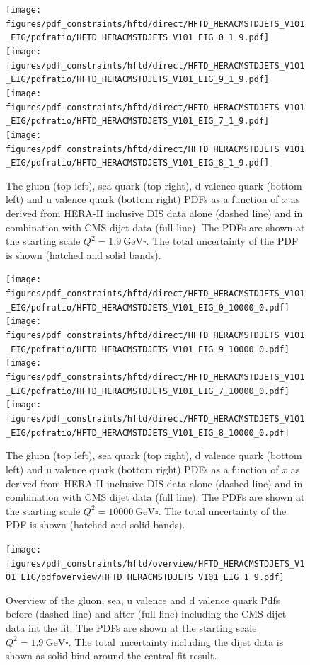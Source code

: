 \begin{figure}[tbp]
  \centering
  \texttt{[image: figures/pdf\_constraints/hftd/direct/HFTD\_HERACMSTDJETS\_V101\_EIG/pdfratio/HFTD\_HERACMSTDJETS\_V101\_EIG\_0\_1\_9.pdf]}\hfill%
  \texttt{[image: figures/pdf\_constraints/hftd/direct/HFTD\_HERACMSTDJETS\_V101\_EIG/pdfratio/HFTD\_HERACMSTDJETS\_V101\_EIG\_9\_1\_9.pdf]}
  \texttt{[image: figures/pdf\_constraints/hftd/direct/HFTD\_HERACMSTDJETS\_V101\_EIG/pdfratio/HFTD\_HERACMSTDJETS\_V101\_EIG\_7\_1\_9.pdf]}\hfill%
  \texttt{[image: figures/pdf\_constraints/hftd/direct/HFTD\_HERACMSTDJETS\_V101\_EIG/pdfratio/HFTD\_HERACMSTDJETS\_V101\_EIG\_8\_1\_9.pdf]}
  \caption[Direct comparison of gluon and quark PDFs]{The gluon (top left), sea
  quark (top right), d valence quark (bottom left) and u valence quark (bottom
right) PDFs as a function of $x$ as derived from HERA-II inclusive DIS data
alone (dashed line) and in combination with CMS dijet data (full line). The PDFs
are shown at the starting scale $Q^2 = \SI{1.9}{\GeV \square}$. The total
uncertainty of the PDF is shown (hatched and solid bands).}
  \label{fig:pdfconstraints:direct:19}
\end{figure}

\begin{figure}[tbp]
  \centering
  \texttt{[image: figures/pdf\_constraints/hftd/direct/HFTD\_HERACMSTDJETS\_V101\_EIG/pdfratio/HFTD\_HERACMSTDJETS\_V101\_EIG\_0\_10000\_0.pdf]}\hfill%
  \texttt{[image: figures/pdf\_constraints/hftd/direct/HFTD\_HERACMSTDJETS\_V101\_EIG/pdfratio/HFTD\_HERACMSTDJETS\_V101\_EIG\_9\_10000\_0.pdf]}
  \texttt{[image: figures/pdf\_constraints/hftd/direct/HFTD\_HERACMSTDJETS\_V101\_EIG/pdfratio/HFTD\_HERACMSTDJETS\_V101\_EIG\_7\_10000\_0.pdf]}\hfill%
  \texttt{[image: figures/pdf\_constraints/hftd/direct/HFTD\_HERACMSTDJETS\_V101\_EIG/pdfratio/HFTD\_HERACMSTDJETS\_V101\_EIG\_8\_10000\_0.pdf]}
  \caption[Direct comparison of gluon and quark PDFs]{The gluon (top left), sea
  quark (top right), d valence quark (bottom left) and u valence quark (bottom
right) PDFs as a function of $x$ as derived from HERA-II inclusive DIS data
alone (dashed line) and in combination with CMS dijet data (full line). The PDFs
are shown at the starting scale $Q^2 = \SI{10000}{\GeV \square}$. The total
uncertainty of the PDF is shown (hatched and solid bands).}
\label{fig:pdfconstraints:direct:10000}
\end{figure}

\begin{figure}[tbp]
  \centering
  \texttt{[image: figures/pdf\_constraints/hftd/overview/HFTD\_HERACMSTDJETS\_V101\_EIG/pdfoverview/HFTD\_HERACMSTDJETS\_V101\_EIG\_1\_9.pdf]}\hfill%
  \caption[Overview of gluon and quark PDFs]{Overview of the gluon, sea, u
  valence and d valence quark Pdfs before (dashed line) and after (full line)
  including the CMS dijet data int the fit. The PDFs are shown at the starting
  scale $Q^2 = \SI{1.9}{\GeV \square}$. The total uncertainty including the dijet
  data is shown as solid bind around the central fit result.}
  \label{fig:pdfconstraints:overview:19}
\end{figure}

